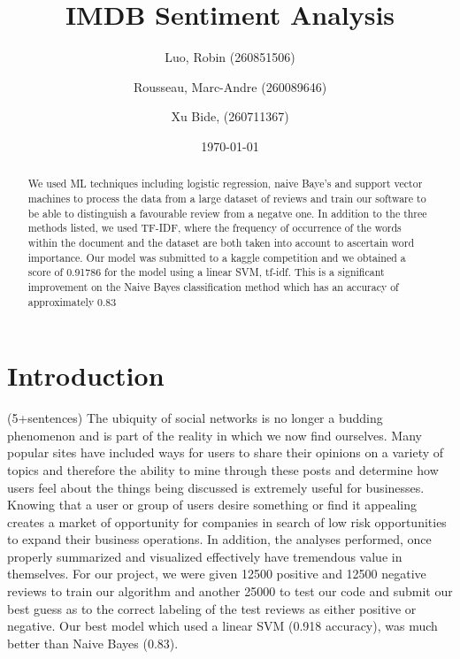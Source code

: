 \documentclass{amsart}
\theoremstyle{definition}
\theoremstyle{remark}
\numberwithin{equation}{section}
\begin{document}
\vspace*{-80pt}

\title{IMDB Sentiment Analysis}

\author{Luo, Robin (260851506)}
\author{Rousseau, Marc-Andre  (260089646)}
\author{Xu Bide, (260711367)}

\date{\today}
\begin{abstract}
We used ML techniques including logistic regression, naive Baye's and support vector machines to process the data from a large dataset of reviews and train our software to be able to distinguish a favourable review from a negatve one.  In addition to the three methods listed, we used TF-IDF, where the frequency of occurrence of the words within the document and the dataset are both taken into account to ascertain word importance.  Our model was submitted to a kaggle competition and we obtained a score of 0.91786 for the model using a linear SVM, tf-idf.  This is a significant improvement on the Naive Bayes classification method which has an accuracy of approximately 0.83 \end{abstract}
\maketitle
\section{Introduction}(5+sentences)
The ubiquity of social networks is no longer a budding phenomenon and is part of the reality in which we now find ourselves.  Many popular sites have included ways for users to share their opinions on a variety of topics and therefore the ability to mine through these posts and determine how users feel about the things being discussed is extremely useful for businesses.  Knowing that a user or group of users desire something or find it appealing creates a market of opportunity for companies in search of low risk opportunities to expand their business operations.  In addition, the analyses performed, once properly summarized and visualized effectively have tremendous value in themselves.  For our project, we were given 12500 positive and 12500 negative reviews to train our algorithm and another 25000 to test our code and submit our best guess as to the correct labeling of the test reviews as either positive or negative.  Our best model which used a linear SVM (0.918 accuracy), was much better than Naive Bayes (0.83).
\end{document}
